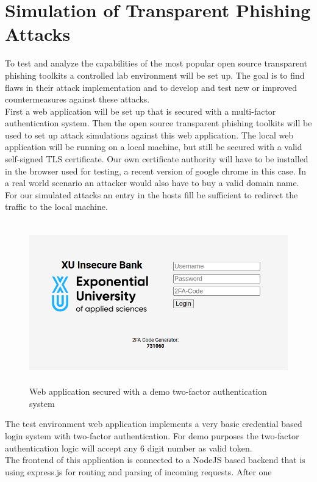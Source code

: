 \documentclass[12pt]{scrbook}
\begin{document}
\section{Simulation of Transparent Phishing Attacks}
To test and analyze the capabilities of the most popular open source
transparent phishing toolkits a controlled lab environment will be set up. The
goal is to find flaws in their attack implementation and to develop and test new
or improved countermeasures against these attacks.\\ First a web application
will be set up that is secured with a multi-factor authentication system. Then
the open source transparent phishing toolkits will be used to set up attack
simulations against this web application. The local web application will be
running on a local machine, but still be secured with a valid self-signed TLS
certificate. Our own certificate authority will have to be installed in the
browser used for testing, a recent version of google chrome in this case. In a
real world scenario an attacker would also have to buy a valid domain name. For
our simulated attacks an entry in the hosts fill be sufficient to redirect the
traffic to the local machine.\\ \begin{figure}[!htb] \centering
  \includegraphics[height=7cm]{./images/2fa_app.png} \caption{Web application
secured with a demo two-factor authentication system} \end{figure} The test
environment web application implements a very basic credential based login
system with two-factor authentication. For demo purposes the two-factor
authentication logic will accept any 6 digit number as valid token.\\The
frontend of this application is connected to a NodeJS based backend that is
using express.js for routing and parsing of incoming requests. After one
\end{document}
